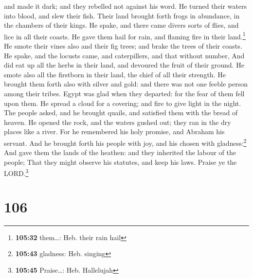 and made it dark; and they rebelled not against his word.
 He turned their waters into blood, and slew their fish.
 Their land brought forth frogs in abundance, in the
chambers of their kings.  He spake, and there came divers
sorts of flies, and lice in all their coasts.  He gave
them hail for rain, and flaming fire in their land.\footnote{\textbf{105:32}
  them\ldots: Heb. their rain hail}  He smote their vines
also and their fig trees; and brake the trees of their coasts.
 He spake, and the locusts came, and caterpillers, and
that without number,  And did eat up all the herbs in
their land, and devoured the fruit of their ground.  He
smote also all the firstborn in their land, the chief of all their
strength.  He brought them forth also with silver and
gold: and there was not one feeble person among their tribes.
 Egypt was glad when they departed: for the fear of them
fell upon them.  He spread a cloud for a covering; and
fire to give light in the night.  The people asked, and
he brought quails, and satisfied them with the bread of heaven.
 He opened the rock, and the waters gushed out; they ran
in the dry places like a river.  For he remembered his
holy promise, and Abraham his servant.  And he brought
forth his people with joy, and his chosen with gladness:\footnote{\textbf{105:43}
  gladness: Heb. singing}  And gave them the lands of the
heathen: and they inherited the labour of the people; 
That they might observe his statutes, and keep his laws. Praise ye the
LORD.\footnote{\textbf{105:45} Praise\ldots: Heb. Hallelujah}

\hypertarget{section-105}{%
\section{106}\label{section-105}}

